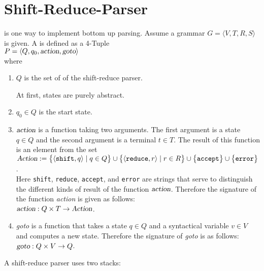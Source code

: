 \section{Shift-Reduce-Parser}
 is one way to implement bottom up parsing.
Assume a grammar $G = \langle V, T, R, S \rangle$ is given.  A  
is defined as a 4-Tuple
\\[0.2cm]
\hspace*{1.3cm}
$P = \langle Q, q_0, \textsl{action}, \textsl{goto} \rangle$
\\[0.2cm]
where
\begin{enumerate}
\item $Q$ is the set of  of the shift-reduce parser.  

      At first, states are purely abstract. 
\item $q_0 \in Q$ is the start state.
\item $\textsl{action}$ is a function taking two arguments. The first argument is a state $q \in Q$
      and the second argument is a terminal $t \in T$.  The result of this function is an element from the set
      \\[0.2cm]
      \hspace*{1.3cm}
      $\textsl{Action} :=
       \bigl\{ \pair(\texttt{shift}, q)  \mid q \in Q \bigr\}               \cup 
       \bigl\{ \pair(\texttt{reduce}, r) \mid r \in R \bigr\} \cup 
       \bigl\{ \texttt{accept} \bigr\}                        \cup
       \bigl\{ \texttt{error}  \bigr\}                         $.
      \\[0.2cm]
      Here \texttt{shift}, \texttt{reduce}, \texttt{accept}, and \texttt{error} are strings that serve to
      distinguish the different kinds of result of the function 
      $\textsl{action}$.  Therefore the signature of the function \textsl{action} is given as follows:
      \\[0.2cm]
      \hspace*{1.3cm}
      $\textsl{action}: Q \times T \rightarrow \textsl{Action}$.
\item \textsl{goto} is a function that takes a state $q \in Q$ and a syntactical variable
      $v \in V$ and computes a new state.  Therefore the signature of \textsl{goto} is as follows:
      \\[0.2cm]
      \hspace*{1.3cm}
      $\textsl{goto}: Q \times V \rightarrow Q$.
\end{enumerate}
A shift-reduce parser uses two stacks:
